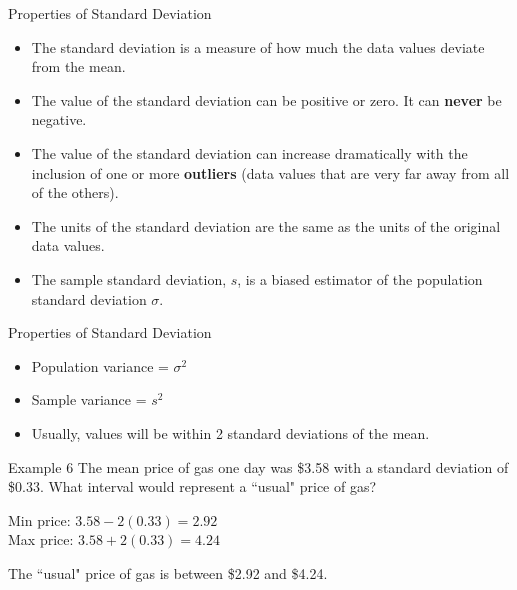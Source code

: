 \documentclass[t]{beamer}
\begin{document}
\begin{frame}{Properties of Standard Deviation}
\begin{itemize}
	\item The standard deviation is a measure of how much the data values deviate from the mean.	\newline\\	\pause
	\item The value of the standard deviation can be positive or zero. It can {\color{red}\textbf{never}} be negative.	\newline\\	\pause
	\item The value of the standard deviation can increase dramatically with the inclusion of one or more {\color{blue}\textbf{outliers}} (data values that are very far away from all of the others).	\newline\\	\pause
	\item The units of the standard deviation are the same as the units of the original data values.	\newline\\	\pause
	\item The sample standard deviation, $s$, is a biased estimator of the population standard deviation $\sigma$.	
\end{itemize}
\end{frame}

\begin{frame}{Properties of Standard Deviation}
\begin{itemize}
	\item Population variance = $\sigma^2$	\newline\\	\pause
	\item Sample variance = $s^2$	\newline\\	\pause
	\item Usually, values will be within 2 standard deviations of the mean.
\end{itemize}
\end{frame}

\begin{frame}{Example 6}
The mean price of gas one day was \$3.58 with a standard deviation of \$0.33. What interval would represent a ``usual" price of gas?	\newline\\	\pause

Min price: $3.58 - 2(0.33) = 2.92$	\newline\\	\pause
Max price: $3.58 + 2(0.33) = 4.24$	\newline\\	\pause

The ``usual" price of gas is between \$2.92 and \$4.24.
\end{frame}
\end{document}

